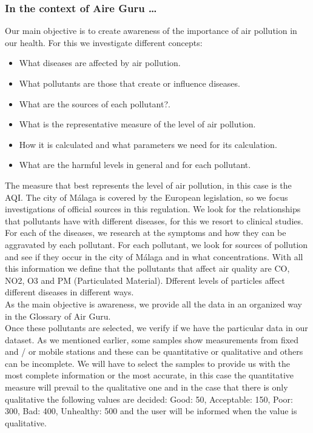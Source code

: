 \subsubsection*{In the context of Aire Guru \ldots}

Our main objective is to create awareness of the importance of air pollution in our health. For this we investigate different concepts:
\begin{itemize}
    \item What diseases are affected by air pollution.
    \item What pollutants are those that create or influence diseases.
    \item What are the sources of each pollutant?.
    \item What is the representative measure of the level of air pollution.
    \item How it is calculated and what parameters we need for its calculation.
    \item What are the harmful levels in general and for each pollutant.
\end{itemize}
The measure that best represents the level of air pollution, in this case is the AQI. The city of Málaga is covered by the European legislation, 
so we focus investigations of official sources in this regulation.
We look for the relationships that pollutants have with different diseases, for this we resort to clinical studies. For each of the diseases, we 
research at the symptoms and how they can be aggravated by each pollutant.
For each pollutant, we look for sources of pollution and see if they occur in the city of Málaga and in what concentrations.
With all this information we define that the pollutants that affect air quality are CO, NO2, O3 and PM (Particulated Material). Dfferent levels of particles
affect different diseases in different ways. \\

As the main objective is awareness, we provide all the data in an organized way in the Glossary of Air Guru. \\

Once these pollutants are selected, we verify if we have the particular data in our dataset. As we mentioned earlier, some samples show measurements 
from fixed and / or mobile stations and these can be quantitative or qualitative and others can be incomplete. We will have to select the
samples to provide us with the most complete information or the most accurate, in this case the quantitative measure will prevail to the qualitative 
one and in the case that there is only qualitative
the following values are decided: Good: 50, Acceptable: 150, Poor: 300, Bad: 400, Unhealthy: 500 and the user will be informed when the value is qualitative. \\


